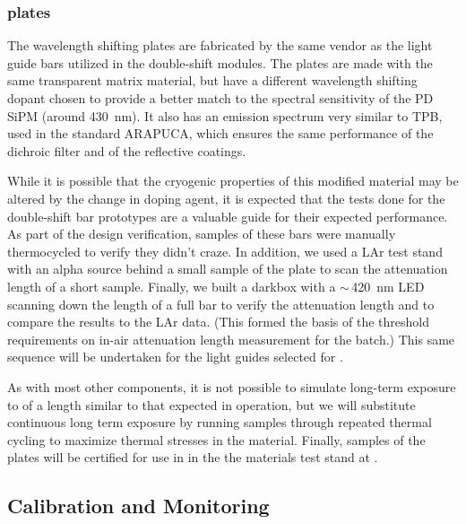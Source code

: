 \subsubsection{ plates}


The  wavelength shifting plates are fabricated by the same vendor as the light guide bars utilized in the double-shift  modules.  The plates are made with the same transparent matrix material, but have a different wavelength shifting dopant chosen to provide a better match to the spectral sensitivity of the PD SiPM (around \SI{430}{nm}). It also has an emission spectrum very similar to TPB, used in the standard ARAPUCA, which ensures the same performance of the dichroic filter and of the reflective coatings.

While it is possible that the cryogenic properties of this modified  material may be altered by the change in doping agent, it is expected that the tests done for the double-shift bar prototypes are a valuable guide for their expected performance.  As part of the design verification, samples of these bars were manually thermocycled to verify they didn't craze. In addition, we used a LAr test stand 
with an alpha source behind a small sample of the  plate to scan the attenuation length of a short sample. Finally, we built a darkbox with a $\sim\,$\SI{420}{nm} LED scanning down the length of a full bar to verify the attenuation length and to compare the results to the LAr data. (This formed the basis of the threshold requirements on in-air attenuation length measurement for the  batch.) 
This same sequence will be undertaken for the light guides selected for . 

As with most other components, it is not possible to simulate long-term exposure to  of a length similar to that expected in  operation, but we will substitute continuous long term exposure by running samples through repeated thermal cycling to maximize thermal stresses in the material.  Finally, samples of the  plates will be certified for use in  in the the materials test stand at .  



\subsection{Calibration and Monitoring}
\label{sec:fdsp-pd-validation-candm}

